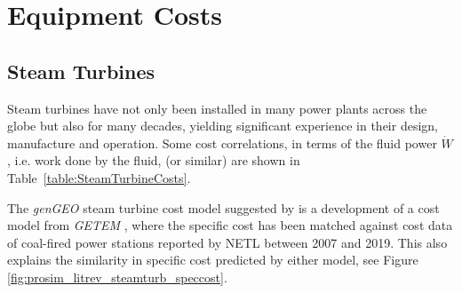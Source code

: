 





\section{Equipment Costs}

    \subsection{Steam Turbines}
        Steam turbines have not only been installed in many power plants across the globe but also for many decades, yielding significant experience in their design, manufacture and operation. Some cost correlations, in terms of the fluid power \(\Dot{W}\), i.e. work done by the fluid, (or similar) are shown in Table~\ref{table:SteamTurbineCosts}.

        The \emph{genGEO} steam turbine cost model suggested by \citeauthor{Adams2021} \cite{Adams2021} is a development of a cost model from \emph{GETEM} \cite{GETEM2016}, where the specific cost has been matched against cost data of coal-fired power stations reported by \ac{NETL} between 2007 and 2019. This also explains the similarity in specific cost predicted by either model, see Figure~ \ref{fig:prosim_litrev_steamturb_speccost}.
        
